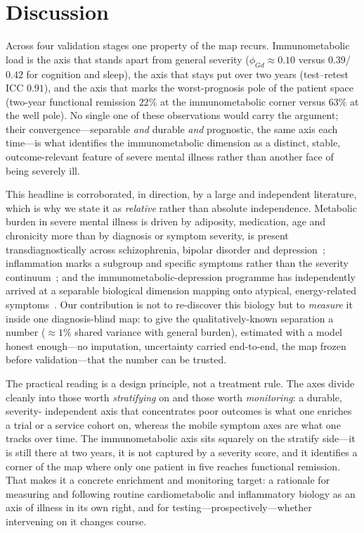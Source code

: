 \section{Discussion}

Across four validation stages one property of the map recurs. Immunometabolic load is the axis
that stands apart from general severity ($\phi_{Gd}\approx 0.10$ versus $0.39$/$0.42$ for
cognition and sleep), the axis that stays put over two years (test--retest ICC $0.91$), and the
axis that marks the worst-prognosis pole of the patient space (two-year functional remission
$22\%$ at the immunometabolic corner versus $63\%$ at the well pole). No single one of these
observations would carry the argument; their convergence---separable \emph{and} durable \emph{and}
prognostic, the same axis each time---is what identifies the immunometabolic dimension as a
distinct, stable, outcome-relevant feature of severe mental illness rather than another face of
being severely ill.

This headline is corroborated, in direction, by a large and independent literature, which is why
we state it as \emph{relative} rather than absolute independence. Metabolic burden in severe
mental illness is driven by adiposity, medication, age and chronicity more than by diagnosis or
symptom severity, is present transdiagnostically across schizophrenia, bipolar disorder and
depression~\citep{vancampfort2015mets,vancampfort2016diabetes,pillinger2017,perry2019,garridotorres2022};
inflammation marks a subgroup and specific symptoms rather than the severity
continuum~\citep{osimo2019,fernandes2016bd,fernandes2016sz}; and the immunometabolic-depression
programme has independently arrived at a separable biological dimension mapping onto atypical,
energy-related symptoms~\citep{penninx2024imd,milaneschi2020,lamers2013,lamers2020,milaneschi2017}.
Our contribution is not to re-discover this biology but to \emph{measure} it inside one
diagnosis-blind map: to give the qualitatively-known separation a number ($\approx 1\%$ shared
variance with general burden), estimated with a model honest enough---no imputation, uncertainty
carried end-to-end, the map frozen before validation---that the number can be trusted.

The practical reading is a design principle, not a treatment rule. The axes divide cleanly into
those worth \emph{stratifying} on and those worth \emph{monitoring}: a durable, severity-%
independent axis that concentrates poor outcomes is what one enriches a trial or a service cohort
on, whereas the mobile symptom axes are what one tracks over time. The immunometabolic axis sits
squarely on the stratify side---it is still there at two years, it is not captured by a severity
score, and it identifies a corner of the map where only one patient in five reaches functional
remission. That makes it a concrete enrichment and monitoring target: a rationale for measuring
and following routine cardiometabolic and inflammatory biology as an axis of illness in its own
right, and for testing---prospectively---whether intervening on it changes course.

